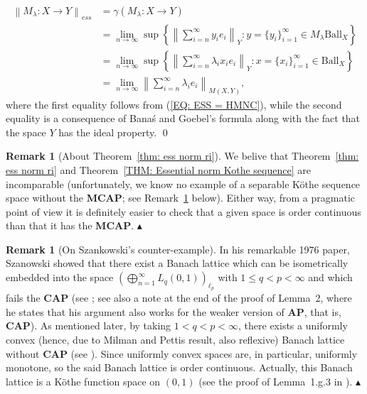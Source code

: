 \documentclass[11pt]{amsart}
\theoremstyle{definition}
\theoremstyle{definition}
\theoremstyle{definition}
\theoremstyle{definition}
\theoremstyle{definition}
\theoremstyle{definition}
\newtheorem{remark}[theorem]{Remark}
\theoremstyle{definition}
\theoremstyle{definition}
\numberwithin{equation}{section}
\numberwithin{equation}{section}
\numberwithin{equation}{section}
\theoremstyle{definition}
\theoremstyle{definition}
\theoremstyle{definition}
\theoremstyle{definition}
\theoremstyle{definition}
\theoremstyle{definition}
\newcommand{\norm}[1]{\left\lVert#1\right\rVert}
\renewenvironment{proof}{\noindent {\bf Proof.}}{\qed}
\newcommand\xqed[1]{%
	\leavevmode\unskip\penalty9999 \hbox{}\nobreak\hfill
	\quad\hbox{#1}}
\newcommand\demo{\xqed{{\Large $\blacktriangle$}}}
\begin{document}
\begin{proof}
\begin{align*}
		\norm{M_{\lambda} \colon X \rightarrow Y}_{ess}
			& = \gamma(M_{\lambda} \colon X \rightarrow Y) \\
			& = \lim_{n \rightarrow \infty} \sup \left\{ \norm{ \sum_{i = n}^{\infty} y_i e_i }_Y \colon y = \{ y_i \}_{i=1}^{\infty} \in M_{\lambda}\text{Ball}_X \right\} \\
			& = \lim_{n \rightarrow \infty} \sup \left\{ \norm{ \sum_{i = n}^{\infty} \lambda_i x_i e_i }_Y \colon x = \{ x_i \}_{i=1}^{\infty} \in \text{Ball}_X \right\} \\
			& = \lim_{n \rightarrow \infty} \norm{ \sum_{i = n}^{\infty} \lambda_i e_i }_{M(X,Y)},
	\end{align*}
	where the first equality follows from (\ref{EQ: ESS = HMNC}),
	while the second equality is a consequence of Bana{\' s} and Goebel's formula \cite[Theorem~6.1.1, p.~23]{BG79}
	along with the fact that the space $Y$ has the ideal property.
\end{proof}

\begin{remark}[About Theorem~\ref{thm: ess norm ri}]
	We belive that Theorem~\ref{thm: ess norm ri} and Theorem~\ref{THM: Essential norm Kothe sequence} are incomparable
	(unfortunately, we know no example of a separable K{\" o}the sequence space without the {\bf MCAP}; see Remark~\ref{REMARK: Szankowski} below).
	Either way, from a pragmatic point of view it is definitely easier to check that a given space is order continuous
	than that it has the {\bf MCAP}.
	\demo
\end{remark}

\begin{remark}[On Szankowski's counter-example] \label{REMARK: Szankowski}
	In his remarkable 1976 paper, Szanowski \cite{Sza76} showed that there exist a Banach lattice which can be isometrically
	embedded into the space $(\bigoplus_{n=1}^{\infty} L_q(0,1))_{\ell_p}$ with $1 \leqslant q < p < \infty$ and which fails
	the {\bf CAP} (see \cite[Proposition~1]{Sza76}; see also a note at the end of the proof of Lemma~2, where he states that his
	argument also works for the weaker version of {\bf AP}, that is, {\bf CAP}). As mentioned later, by taking $1 < q < p < \infty$,
	there exists a uniformly convex (hence, due to Milman and Pettis result, also reflexive) Banach lattice without {\bf CAP}
	(see \cite[Proposition~2]{Sza76}). Since uniformly convex spaces are, in particular, uniformly monotone,
	so the said Banach lattice is order continuous. Actually, this Banach lattice is a K{\" o}the function space on $(0,1)$
	(see the proof of Lemma~1.g.3 in \cite{LT79}).
	\demo
\end{remark}
\end{document}
